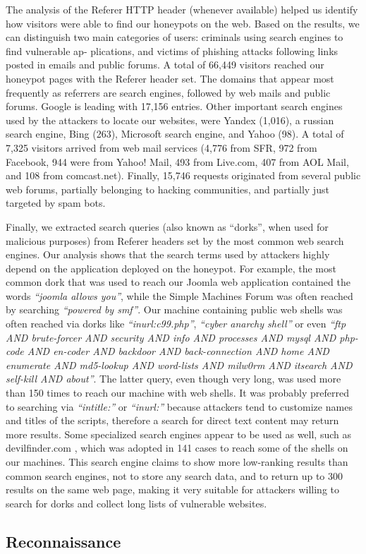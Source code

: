 The analysis of the Referer HTTP header (whenever available) helped us identify how visitors were able to find our honeypots on the web. Based on the results, we can distinguish two main categories of users: criminals using search engines to find vulnerable ap- plications, and victims of phishing attacks following links posted in emails and public forums.
A total of 66,449 visitors reached our honeypot pages with the Referer header set. The domains that appear most frequently as referrers are search engines, followed by web mails and public forums. Google is leading with 17,156 entries. Other important search engines used by the attackers to locate our websites, were Yandex (1,016), a russian search engine, Bing (263), Microsoft search engine, and Yahoo (98). A total of 7,325 visitors arrived from web mail services (4,776 from SFR, 972 from Facebook, 944 were from Yahoo! Mail, 493 from Live.com, 407 from AOL Mail, and 108 from comcast.net). Finally, 15,746 requests originated from several public web forums, partially belonging to hacking communities, and partially just targeted by spam bots.

Finally, we extracted search queries (also known as ``dorks'', when used for malicious purposes) from Referer headers set by the most common web search engines. Our analysis shows that the search terms used by attackers highly depend on the application deployed on the honeypot. For example, the most common dork that was used to reach our Joomla web application contained the words \emph{``joomla allows you''}, while the Simple Machines Forum was often reached by searching \emph{``powered by smf''}. Our machine containing public web shells was often reached via dorks like \emph{``inurl:c99.php''}, \emph{``cyber anarchy shell''} or even \emph{``ftp AND brute-forcer AND security AND info AND processes AND mysql AND php-code AND en-coder AND backdoor AND back-connection AND home AND enumerate AND md5-lookup AND word-lists AND milw0rm AND itsearch AND self-kill AND about''}. The latter query, even though very long, was used more than 150 times to reach our machine with web shells. It was probably preferred to searching via \emph{``intitle:''} or \emph{``inurl:''} because attackers tend to customize names and titles of the scripts, therefore a search for direct text content may return more results. Some specialized search engines appear to be used as well, such as devilfinder.com \cite{devilfinder}, which was adopted in 141 cases to reach some of the shells on our machines. This search engine claims to show more low-ranking results than common search engines, not to store any search data, and to return up to 300 results on the same web page, making it very suitable for attackers willing to search for dorks and collect long lists of vulnerable websites.

\subsection{Reconnaissance}

